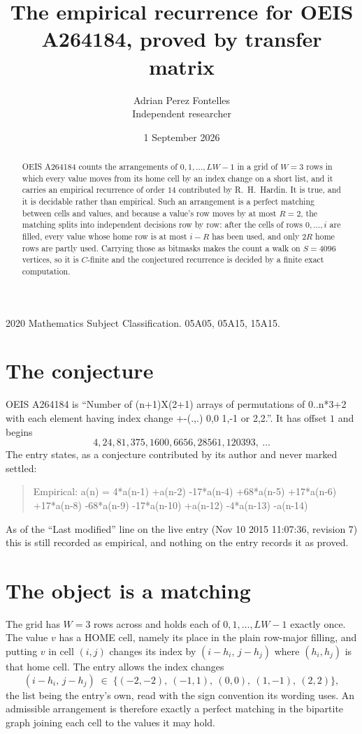 \documentclass[11pt,a4paper]{article}
\title{The empirical recurrence for OEIS A264184, proved by transfer matrix}
\author{Adrian Perez Fontelles\\ \small Independent researcher}
\date{1 September 2026}
\theoremstyle{plain}
\theoremstyle{definition}
\begin{document}
\maketitle

\begin{abstract}
OEIS A264184 counts the arrangements of $0,1,\dots,LW-1$ in a grid of $W=3$ rows in which
every value moves from its home cell by an index change on a short list, and it carries an
empirical recurrence of order $14$ contributed by R.~H.~Hardin. It is true, and it is
decidable rather than empirical. Such an arrangement is a perfect matching between cells and
values, and because a value's row moves by at most $R=2$, the matching splits into
independent decisions row by row: after the cells of rows $0,\dots,i$ are filled,
every value whose home row is at most $i-R$ has been used, and only $2R$ home rows are
partly used. Carrying those as bitmasks makes the count a walk on $S=4096$ vertices, so it is
$C$-finite and the conjectured recurrence is decided by a finite exact computation.
\end{abstract}

\noindent\small 2020 Mathematics Subject Classification. 05A05, 05A15, 15A15.\normalsize

\section{The conjecture}

OEIS A264184 is ``Number of (n+1)X(2+1) arrays of permutations of 0..n*3+2 with each element having index change +-(.,.) 0,0 1,-1 or 2,2.''. It has offset $1$ and begins
\[
4, 24, 81, 375, 1600, 6656, 28561, 120393,\ \dots
\]
The entry states, as a conjecture contributed by its author and never marked settled:
\begin{quote}
Empirical: a(n) = 4*a(n-1) +a(n-2) -17*a(n-4) +68*a(n-5) +17*a(n-6) +17*a(n-8) -68*a(n-9) -17*a(n-10) +a(n-12) -4*a(n-13) -a(n-14)
\end{quote}
As of the ``Last modified'' line on the live entry (Nov 10 2015 11:07:36, revision 7) this is still
recorded as empirical, and nothing on the entry records it as proved.

\section{The object is a matching}

The grid has $W=3$ rows across and holds each of $0,1,\dots,LW-1$ exactly once. The value
$v$ has a HOME cell, namely its place in the plain row-major filling, and putting $v$ in cell
$(i,j)$ changes its index by $(i-h_i,\,j-h_j)$ where $(h_i,h_j)$ is that home cell. The entry
allows the index changes
\[
(i-h_i,\,j-h_j)\;\in\;\{(-2,-2),\ (-1,1),\ (0,0),\ (1,-1),\ (2,2)\},
\]
the list being the entry's own, read with the sign convention its wording uses. An admissible
arrangement is therefore exactly a perfect matching in the bipartite graph joining each cell to
the values it may hold.
\end{document}
